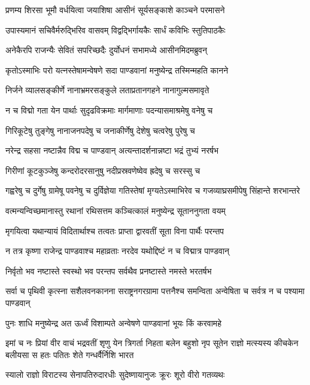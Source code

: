 \twolineshloka
{प्रणम्य शिरसा भूमौ वर्धयित्वा जयाशिषा}
{आसीनं सूर्यसङ्काशे काञ्चने परमासने}


\twolineshloka
{उपास्यमानं सचिवैर्मरुद्भिरिव वासवम्}
{विद्वद्भिर्गायकैः सार्धं कविभिः स्तुतिपाठकैः}


\twolineshloka
{अनेकैरपि राजन्यैः सेवितं सपरिच्छदैः}
{दुर्योधनं सभामध्ये आसीनमिदमब्रुवन्}


\twolineshloka
{कृतोऽस्माभिः परो यत्नस्तेषामन्वेषणे सदा}
{पाण्डवानां मनुष्येन्द्र तस्मिन्महति कानने}


\twolineshloka
{निर्जने व्यालसङ्कीर्णे नानाभ्रमरसङ्कुले}
{लताप्रतानगहने नानागुल्मसमावृते}


\twolineshloka
{न च विद्मो गता येन पार्थाः सुदृढविक्रमाः}
{मार्गमाणाः पदन्यासमाश्रमेषु वनेषु च}


\twolineshloka
{गिरिकूटेषु तुङ्गेषु नानाजनपदेषु च}
{जनाकीर्णेषु देशेषु चत्वरेषु पुरेषु च}


\twolineshloka
{नरेन्द्र सहसा नष्टान्नैव विद्म च पाण्डवान्}
{अत्यन्तादर्शनान्नष्टा भद्रं तुभ्यं नरर्षभ}


\twolineshloka
{गिरीणां कूटकुञ्जेषु कन्दरोदरसानुषु}
{नदीप्रस्रवणेष्वेव ह्रदेषु च सरस्सु च}


\threelineshloka
{गह्वरेषु च दुर्गेषु ग्रामेषू पवनेषु च}
{दुर्विज्ञेया गतिस्तेषां मृग्यतेऽस्माभिरेव च}
{गजव्याघ्रसमीपेषु सिंहान्ते शरभान्तरे}


\twolineshloka
{वत्मन्यन्विच्छमानास्तु रथानां रथिसत्तम}
{कञ्चित्कालं मनुष्येन्द्र सूताननुगता वयम्}


\twolineshloka
{मृगयित्वा यथान्यायं विदितार्थाश्च तत्वतः}
{प्राप्ता द्वारवतीं सूता विना पार्थैः परन्तप}


\twolineshloka
{न तत्र कृष्णा राजेन्द्र पाण्डवाश्च महाव्रताः}
{नरदेव यथोद्दिष्टं न च विद्मात्र पाण्डवान्}


\twolineshloka
{निर्वृतो भव नष्टास्ते स्वस्थो भव परन्तप}
{सर्वथैव प्रनष्टास्ते नमस्ते भरतर्षभ}


\threelineshloka
{सर्वा च पृथिवी कृत्स्ना सशैलवनकानना}
{सराष्ट्रनगरग्रामा पत्तनैश्च समन्विता}
{अन्वेषिता च सर्वत्र न च पश्यामा पाण्डवान्}


\twolineshloka
{पुनः शाधि मनुष्येन्द्र अत ऊर्ध्वं विशाम्पते}
{अन्वेषणे पाण्डवानां भूयः किं करवामहे}


\onelineshloka
{इमां च नः प्रियां वीर वाचं भद्रवतीं शृणु}
\threelineshloka
{येन त्रिगर्ता निहता बलेन बहुशो नृप}
{सूतेन राज्ञो मत्स्यस्य कीचकेन बलीयसा}
{स हतः पतितः शेते गन्धर्वैर्निशि भारत}


\twolineshloka
{स्यालो राज्ञो विराटस्य सेनापतिरुदारधीः}
{सुदेष्णायानुजः क्रूरः शूरो वीरो गतव्यथः}


